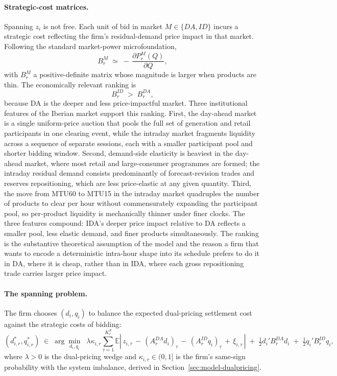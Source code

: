 \documentclass[11pt]{article}
\begin{document}
\paragraph{Strategic-cost matrices.} Spanning $z_{i}$ is not free. Each unit of bid in market $M \in \{DA, ID\}$ incurs a strategic cost reflecting the firm's residual-demand price impact in that market. Following the standard market-power microfoundation,
\begin{equation}
B^{M}_r \;\simeq\; -\,\frac{\partial P^{M}_r(Q)}{\partial Q},
\end{equation}
with $B^{M}_r$ a positive-definite matrix whose magnitude is larger when products are thin. The economically relevant ranking is
\begin{equation}
B^{ID}_{r} \;>\; B^{DA}_{r},
\label{eq:bdamuch}
\end{equation}
because DA is the deeper and less price-impactful market. Three institutional features of the Iberian market support this ranking. First, the day-ahead market is a single uniform-price auction that pools the full set of generation and retail participants in one clearing event, while the intraday market fragments liquidity across a sequence of separate sessions, each with a smaller participant pool and shorter bidding window. Second, demand-side elasticity is heaviest in the day-ahead market, where most retail and large-consumer programmes are formed; the intraday residual demand consists predominantly of forecast-revision trades and reserves repositioning, which are less price-elastic at any given quantity. Third, the move from MTU60 to MTU15 in the intraday market quadruples the number of products to clear per hour without commensurately expanding the participant pool, so per-product liquidity is mechanically thinner under finer clocks. The three features compound: IDA's deeper price impact relative to DA reflects a smaller pool, less elastic demand, and finer products simultaneously. The ranking is the substantive theoretical assumption of the model and the reason a firm that wants to encode a deterministic intra-hour shape into its schedule prefers to do it in DA, where it is cheap, rather than in IDA, where each gross repositioning trade carries larger price impact.

\paragraph{The spanning problem.} The firm chooses $(d_{i}, q_{i})$ to balance the expected dual-pricing settlement cost against the strategic costs of bidding:
\begin{equation}
(d^{*}_{i,r}, q^{*}_{i,r}) \;\in\; \arg\min_{d_{i}, q_{i}}
\;\;
\lambda \kappa_{i,r}
\sum_{\tau=1}^{K^{S}_r}
\mathbb{E}\!\left|\,z_{i,\tau} \,-\, (A^{DA}_r d_{i})_{\tau} \,-\, (A^{ID}_r q_{i})_{\tau} \,+\, \xi_{i,\tau}\,\right|
\;+\; \tfrac{1}{2} d_{i}' B^{DA}_r d_{i}
\;+\; \tfrac{1}{2} q_{i}' B^{ID}_r q_{i},
\label{eq:spanning}
\end{equation}
where $\lambda > 0$ is the dual-pricing wedge and $\kappa_{i,r} \in (0,1]$ is the firm's same-sign probability with the system imbalance, derived in Section~\ref{sec:model-dualpricing}.
\end{document}
